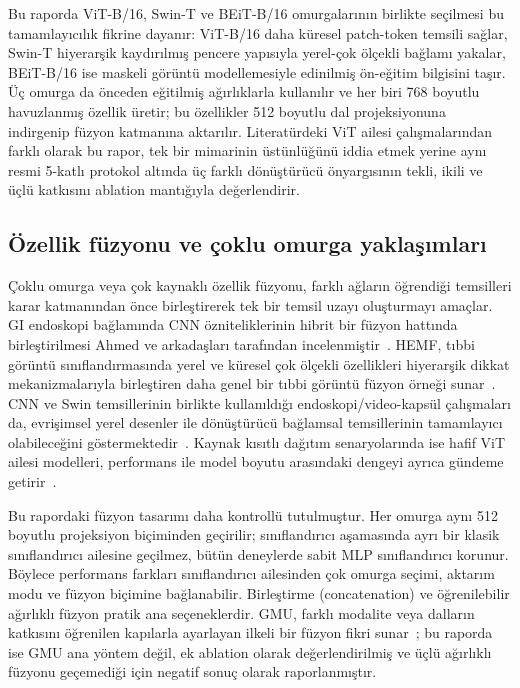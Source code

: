 Bu raporda ViT-B/16, Swin-T ve BEiT-B/16 omurgalarının birlikte seçilmesi bu
tamamlayıcılık fikrine dayanır: ViT-B/16 daha küresel patch-token temsili sağlar,
Swin-T hiyerarşik kaydırılmış pencere yapısıyla yerel-çok ölçekli bağlamı yakalar,
BEiT-B/16 ise maskeli görüntü modellemesiyle edinilmiş ön-eğitim bilgisini taşır. Üç
omurga da önceden eğitilmiş ağırlıklarla kullanılır ve her biri 768 boyutlu
havuzlanmış özellik üretir; bu özellikler 512 boyutlu dal projeksiyonuna indirgenip
füzyon katmanına aktarılır. Literatürdeki ViT ailesi çalışmalarından farklı olarak bu
rapor, tek bir mimarinin üstünlüğünü iddia etmek yerine aynı resmi 5-katlı protokol
altında üç farklı dönüştürücü önyargısının tekli, ikili ve üçlü katkısını ablation
mantığıyla değerlendirir.

\subsection{Özellik füzyonu ve çoklu omurga yaklaşımları}

Çoklu omurga veya çok kaynaklı özellik füzyonu, farklı ağların öğrendiği temsilleri
karar katmanından önce birleştirerek tek bir temsil uzayı oluşturmayı amaçlar. GI
endoskopi bağlamında CNN özniteliklerinin hibrit bir füzyon hattında birleştirilmesi
Ahmed ve arkadaşları tarafından incelenmiştir~\cite{ahmed2023hybridfusion}. HEMF,
tıbbi görüntü sınıflandırmasında yerel ve küresel çok ölçekli özellikleri hiyerarşik
dikkat mekanizmalarıyla birleştiren daha genel bir tıbbi görüntü füzyon örneği
sunar~\cite{he2025hemf}. CNN ve Swin temsillerinin birlikte kullanıldığı
endoskopi/video-kapsül çalışmaları da, evrişimsel yerel desenler ile dönüştürücü
bağlamsal temsillerinin tamamlayıcı olabileceğini göstermektedir~\cite{subedi2024cnnswin}.
Kaynak kısıtlı dağıtım senaryolarında ise hafif ViT ailesi modelleri, performans ile
model boyutu arasındaki dengeyi ayrıca gündeme getirir~\cite{varam2024edgevit}.

Bu rapordaki füzyon tasarımı daha kontrollü tutulmuştur. Her omurga aynı 512 boyutlu
projeksiyon biçiminden geçirilir; sınıflandırıcı aşamasında ayrı bir klasik
sınıflandırıcı ailesine geçilmez, bütün deneylerde sabit MLP sınıflandırıcı korunur.
Böylece performans farkları sınıflandırıcı ailesinden çok omurga seçimi, aktarım modu
ve füzyon biçimine bağlanabilir. Birleştirme
(concatenation) ve öğrenilebilir ağırlıklı füzyon pratik ana seçeneklerdir. GMU,
farklı modalite veya dalların katkısını öğrenilen kapılarla ayarlayan ilkeli bir
füzyon fikri sunar~\cite{arevalo2017gmu}; bu raporda ise GMU ana yöntem değil, ek
ablation olarak değerlendirilmiş ve üçlü ağırlıklı füzyonu geçemediği için negatif
sonuç olarak raporlanmıştır.

